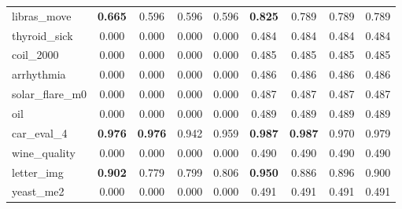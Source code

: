 \begin{figure}[ht]
\begin{tabular}{p{22mm}|*4{p{14mm}}|*4{p{14mm}}}
        libras\_move&\multicolumn{1}{c}{\textbf{0.665}}&\multicolumn{1}{c}{0.596}&\multicolumn{1}{c}{0.596}&\multicolumn{1}{c|}{0.596}&\multicolumn{1}{c}{\textbf{0.825}}&\multicolumn{1}{c}{0.789}&\multicolumn{1}{c}{0.789}&\multicolumn{1}{c}{0.789}\\
        thyroid\_sick&\multicolumn{1}{c}{0.000}&\multicolumn{1}{c}{0.000}&\multicolumn{1}{c}{0.000}&\multicolumn{1}{c|}{0.000}&\multicolumn{1}{c}{0.484}&\multicolumn{1}{c}{0.484}&\multicolumn{1}{c}{0.484}&\multicolumn{1}{c}{0.484}\\
        coil\_2000&\multicolumn{1}{c}{0.000}&\multicolumn{1}{c}{0.000}&\multicolumn{1}{c}{0.000}&\multicolumn{1}{c|}{0.000}&\multicolumn{1}{c}{0.485}&\multicolumn{1}{c}{0.485}&\multicolumn{1}{c}{0.485}&\multicolumn{1}{c}{0.485}\\
        arrhythmia&\multicolumn{1}{c}{0.000}&\multicolumn{1}{c}{0.000}&\multicolumn{1}{c}{0.000}&\multicolumn{1}{c|}{0.000}&\multicolumn{1}{c}{0.486}&\multicolumn{1}{c}{0.486}&\multicolumn{1}{c}{0.486}&\multicolumn{1}{c}{0.486}\\
        solar\_flare\_m0&\multicolumn{1}{c}{0.000}&\multicolumn{1}{c}{0.000}&\multicolumn{1}{c}{0.000}&\multicolumn{1}{c|}{0.000}&\multicolumn{1}{c}{0.487}&\multicolumn{1}{c}{0.487}&\multicolumn{1}{c}{0.487}&\multicolumn{1}{c}{0.487}\\
        oil&\multicolumn{1}{c}{0.000}&\multicolumn{1}{c}{0.000}&\multicolumn{1}{c}{0.000}&\multicolumn{1}{c|}{0.000}&\multicolumn{1}{c}{0.489}&\multicolumn{1}{c}{0.489}&\multicolumn{1}{c}{0.489}&\multicolumn{1}{c}{0.489}\\
        car\_eval\_4&\multicolumn{1}{c}{\textbf{0.976}}&\multicolumn{1}{c}{\textbf{0.976}}&\multicolumn{1}{c}{0.942}&\multicolumn{1}{c|}{0.959}&\multicolumn{1}{c}{\textbf{0.987}}&\multicolumn{1}{c}{\textbf{0.987}}&\multicolumn{1}{c}{0.970}&\multicolumn{1}{c}{0.979}\\
        wine\_quality&\multicolumn{1}{c}{0.000}&\multicolumn{1}{c}{0.000}&\multicolumn{1}{c}{0.000}&\multicolumn{1}{c|}{0.000}&\multicolumn{1}{c}{0.490}&\multicolumn{1}{c}{0.490}&\multicolumn{1}{c}{0.490}&\multicolumn{1}{c}{0.490}\\
        letter\_img&\multicolumn{1}{c}{\textbf{0.902}}&\multicolumn{1}{c}{0.779}&\multicolumn{1}{c}{0.799}&\multicolumn{1}{c|}{0.806}&\multicolumn{1}{c}{\textbf{0.950}}&\multicolumn{1}{c}{0.886}&\multicolumn{1}{c}{0.896}&\multicolumn{1}{c}{0.900}\\
        yeast\_me2&\multicolumn{1}{c}{0.000}&\multicolumn{1}{c}{0.000}&\multicolumn{1}{c}{0.000}&\multicolumn{1}{c|}{0.000}&\multicolumn{1}{c}{0.491}&\multicolumn{1}{c}{0.491}&\multicolumn{1}{c}{0.491}&\multicolumn{1}{c}{0.491}\\

\end{tabular}
\end{figure}
